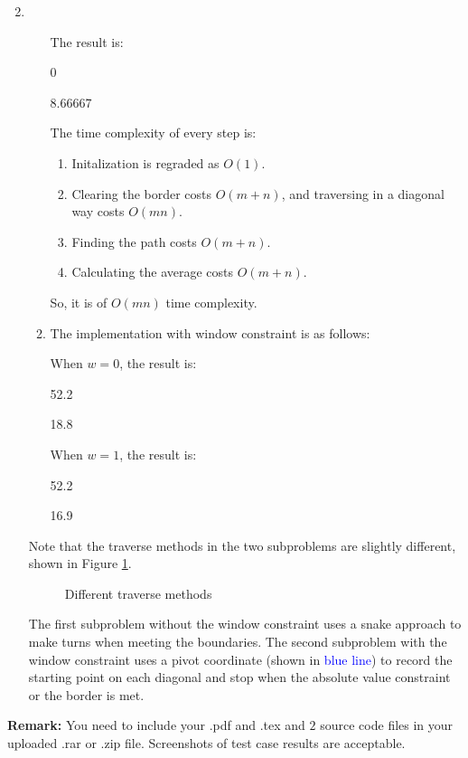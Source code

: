 \documentclass[12pt,a4paper]{article}
\makeatletter
\newtheorem*{solution}{Solution}
\theoremstyle{definition}
\renewenvironment{solution}[1][Solution] {\par\pushQED{\qed}\normalfont\topsep6\p@\@plus6\p@\relax\trivlist\item[\hskip\labelsep\bfseries#1\@addpunct{.}]\ignorespaces}{\popQED\endtrivlist\@endpefalse} \makeatother
\providecommand{\code}[2]{}
\makeatother
\begin{document}
\begin{enumerate}
\begin{solution}
\begin{enumerate}
				The result is:
				\begin{tcolorbox}
					0

					8.66667
				\end{tcolorbox}

				The time complexity of every step is:
				\begin{enumerate}
					\item Initalization is regraded as $O(1)$.
					\item Clearing the border costs $O(m+n)$, and traversing in a diagonal way costs $O(mn)$.
					\item Finding the path costs $O(m+n)$.
					\item Calculating the average costs $O(m+n)$. 
				\end{enumerate}
				So, it is of $O(mn)$ time complexity.
				\item The implementation with window constraint is as follows:
				\code{Code-DTWW.cpp}{c++}

				When $w=0$, the result is:
				\begin{tcolorbox}
					52.2

					18.8
				\end{tcolorbox}

				When $w=1$, the result is:
				\begin{tcolorbox}[skin=mycross]
					52.2

					16.9
				\end{tcolorbox}
			\end{enumerate}

			Note that the traverse methods in the two subproblems are slightly different, shown in Figure \ref{fig:trav}.
			
			\begin{figure}[H]
				\centering
				\hspace{1em}
				\caption{Different traverse methods}
				\label{fig:trav}
			\end{figure}

			The first subproblem without the window constraint uses a snake approach to make turns when meeting the boundaries. The second subproblem with the window constraint uses a pivot coordinate (shown in \textcolor{blue}{blue line}) to record the starting point on each diagonal and stop when the absolute value constraint or the border is met.
		\end{solution}
		
	\end{enumerate}
	
	\vspace{20pt}
	
	\textbf{Remark:} You need to include your .pdf and .tex and {\color{red}\emph{$2$}} source code files in your uploaded .rar or .zip file. Screenshots of test case results are acceptable.
	
\end{document}
